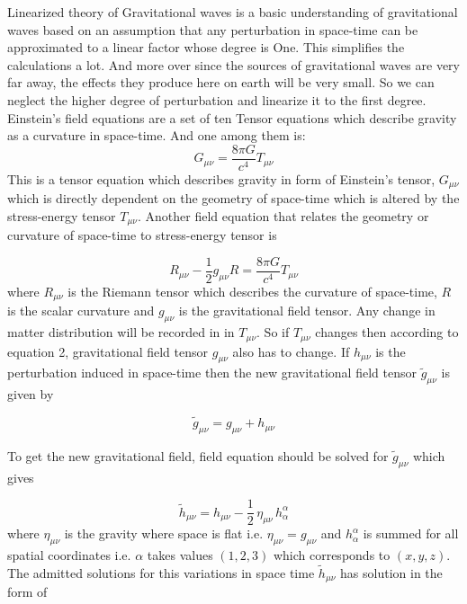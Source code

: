 Linearized theory of Gravitational waves is a basic understanding of gravitational waves based on an assumption that any perturbation in space-time can be approximated to a linear factor whose degree is One. This simplifies the calculations a lot. And more over since the sources of gravitational waves are very far away, the effects they produce here on earth will be very small. So we can neglect the higher degree of perturbation and linearize it to the first degree. \\

Einstein's field equations are a set of ten Tensor equations which describe gravity as a curvature in space-time. And one among them is: 
\begin{equation}
    G_{\mu\nu}= \frac{8 \pi  G}{c^{4}}  T_{\mu\nu}
\end{equation}
This is a tensor equation which describes gravity in form of Einstein's tensor, $G_{\mu\nu}$ which is directly dependent on the geometry of space-time which is altered by the stress-energy tensor $T_{\mu\nu}$. Another field equation that relates the geometry or curvature of space-time to stress-energy tensor is 

\begin{equation}
    R_{\mu\nu}-\frac{1}{2}g_{\mu\nu}R=\frac{8\pi G}{c^{4}}T_{\mu\nu}
\end{equation}
where $R_{\mu\nu}$ is the Riemann tensor which describes the curvature of space-time, $R$ is the scalar curvature and $g_{\mu\nu}$ is the gravitational field tensor. Any change in matter distribution will be recorded in in $T_{\mu\nu}$. So if $T_{\mu\nu}$ changes then according to equation 2, gravitational field tensor $g_{\mu\nu}$ also has to change. If $h_{\mu\nu}$ is the perturbation induced in space-time then the new gravitational field tensor $\tilde{g}_{\mu\nu}$ is given by \cite{Kokkotas_2008}

\begin{equation}
    \tilde{g}_{\mu\nu} = g_{\mu\nu} + h_{\mu\nu}
\end{equation}

\noindent To get the new gravitational field, field equation should be solved for $\tilde{g}_{\mu\nu}$ which gives 

\begin{equation}
    \tilde{h}_{\mu\nu} = h_{\mu\nu} - \frac{1}{2} \, \eta_{\mu\nu} \, h^{\alpha}_{\alpha}
\end{equation}
 where $\eta_{\mu\nu}$ is the gravity where space is flat i.e. $\eta_{\mu\nu} = g_{\mu\nu}$ and $h^{\alpha}_{\alpha}$ is summed for all spatial coordinates i.e. $\alpha$ takes values $(1,2,3) $ which corresponds to $(x,y,z)$. The admitted solutions for this variations in space time $\tilde{h}_{\mu\nu}$ has solution in the form of 
 
